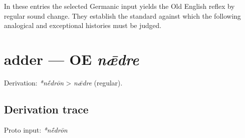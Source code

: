 \documentclass[
  british,
  a4paper,
  openany]{book}
\providecommand{\texorpdfstring}[2]{#1}
\begin{document}
In these entries the selected Germanic input yields the Old English
reflex by regular sound change. They establish the standard against
which the following analogical and exceptional histories must be judged.

\section{\texorpdfstring{adder --- OE
\emph{nǣdre}}{adder --- OE nǣdre}}\label{adder-oe-nux1e3dre}


Derivation: \emph{*nḗdrōn} \textgreater{} \emph{nǣdre} (regular).

\subsection{Derivation trace}\label{derivation-trace}

Proto input: \emph{*nḗdrōn}

\begingroup
\setlength{\fboxsep}{6pt}
\end{document}
